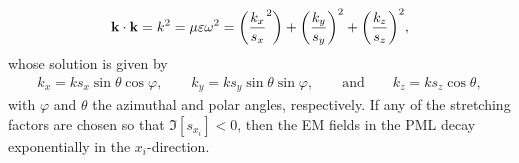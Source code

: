     \begin{align}
        \vb{k} \cdot \vb{k}  = k^2 = \mu\varepsilon\omega^2 =
            \qty(\frac{k_x}{s_x}^2 )+ \qty(\frac{k_y}{s_y})^2 + \qty(\frac{k_z}{s_z})^2,
     \label{eq:k-reldisp}
    \end{align}
    whose solution is given by \cite{jin_theory_2010,chew_complex_1997}
    \begin{align}
        k_x = k s_x \sin\theta\cos\varphi, \qquad
            k_y = k s_y \sin\theta\sin\varphi, \qquad \text{and}\qquad
                k_z = k s_z \cos\theta,
     \label{eq:kstretchcomp}
    \end{align}
    with $\varphi$ and $\theta$ the azimuthal and polar angles, respectively. If any of the stretching factors are chosen so that $\Im[s_{x_i}]<0$, then the EM fields in the PML decay exponentially in the $x_i$-direction.

